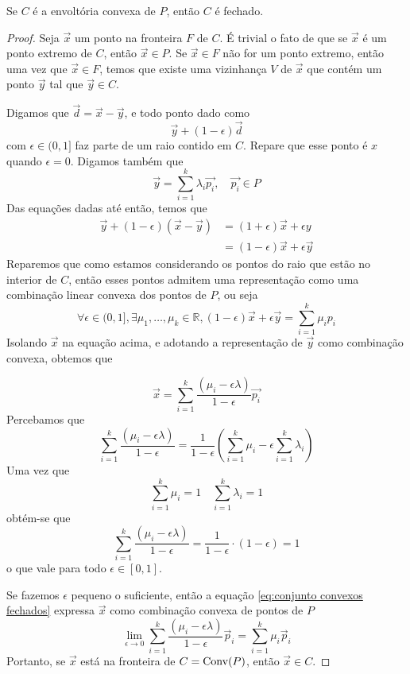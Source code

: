 \begin{prop:conjuntos convexos fechados}
Se $C$ é a envoltória convexa de $P$, então $C$ é fechado.

  \begin{proof}
   Seja $\vec{x}$ um ponto na fronteira $F$ de $C$. É trivial o fato de que se
   $\vec{x}$ é um ponto extremo de $C$, então $\vec{x} \in P$. Se
   $\vec{x} \in F$ não for um ponto extremo, então uma vez que $\vec{x} \in F$,
   temos que existe uma vizinhança $V$ de $\vec{x}$ que contém um ponto $\vec{y}$
   tal que $\vec{y} \in C$.

   Digamos que $\vec{d} = \vec{x} - \vec{y}$, e todo ponto dado como \[
     \vec{y} + (1 - \epsilon) \vec{d}
   \]com $\epsilon \in (0, 1]$ faz parte de um raio contido em $C$. Repare que
   esse ponto é $x$ quando $\epsilon = 0$. Digamos também que \[
     \vec{y} = \sum_{i=1}^{k} \lambda_i \vec{p_i}, \quad \vec{p_i}  \in P
   \]Das equações dadas até então, temos que
   \begin{align*}
     \vec{y} + (1 - \epsilon) (\vec{x} - \vec{y}) &= (1 + \epsilon) \vec{x}
     + \epsilon y \\
                                                  &= (1 - \epsilon) \vec{x} + \epsilon \vec{y}
   \end{align*}
   Reparemos que como estamos considerando os pontos do raio que estão no
   interior de $C$, então esses pontos
   admitem uma representação como uma combinação linear convexa dos pontos de
   $P$, ou seja
   \[
     \forall \epsilon \in (0, 1] , \exists \mu_1, \dots, \mu_k \in \mathbb{R},
     (1-\epsilon)\vec{x} + \epsilon \vec{y} = \sum_{i=1}^{k} \mu_i p_i
   \]
   Isolando $\vec{x}$ na equação acima, e adotando a representação de $\vec{y}$
   como combinação convexa, obtemos que

   \begin{equation}
     \label{eq:conjunto convexos fechados}
     \vec{x} = \sum_{i=1}^{k} \frac{(\mu_i  - \epsilon \lambda)}{1-\epsilon} \vec{p_i}
   \end{equation}
   Percebamos que
   \[
    \sum_{i=1}^{k} \frac{(\mu_i  - \epsilon \lambda)}{1-\epsilon} =
    \frac{1}{1-\epsilon}\left(
      \sum_{i=1}^{k} \mu_i -   \epsilon \sum_{i=1}^{k} \lambda_i\right)
   \]
   Uma vez que
   \[
    \sum_{i=1}^{k} \mu_i = 1 \quad \sum_{i=1}^{k} \lambda_i = 1
   \]
   obtém-se que
   \[
   \sum_{i=1}^{k} \frac{(\mu_i  - \epsilon \lambda)}{1-\epsilon} =
   \frac{1}{1-\epsilon} \cdot (1 - \epsilon) = 1
   \]
   o que vale para todo $\epsilon \in [0, 1]$.

   Se fazemos $\epsilon$ pequeno o suficiente, então a equação
   \ref{eq:conjunto convexos fechados} expressa $\vec{x}$ como combinação
   convexa de pontos de $P$
   \[
     \lim_{\epsilon \to 0} \sum_{i=1}^{k} \frac{(\mu_i  - \epsilon \lambda)}{1-\epsilon} \vec{p}_i
     = \sum_{i=1}^{k} \mu_i \vec{p}_i
   \]
   Portanto, se $\vec{x}$ está na fronteira de $C = \mathrm{Conv}(P)$, então
   $\vec{x} \in C$.
 \end{proof}
\end{prop:conjuntos convexos fechados}

